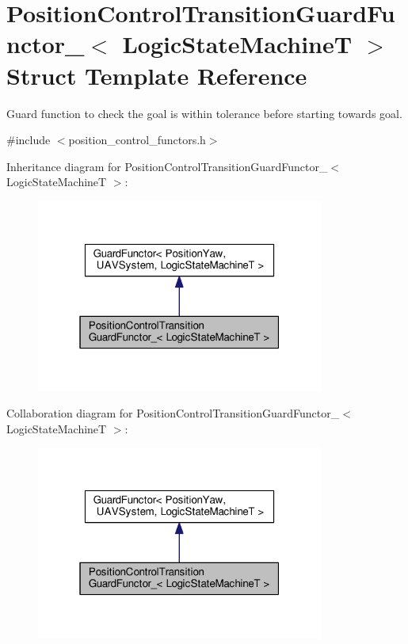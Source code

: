 \hypertarget{structPositionControlTransitionGuardFunctor__}{\section{Position\-Control\-Transition\-Guard\-Functor\-\_\-$<$ Logic\-State\-Machine\-T $>$ Struct Template Reference}
\label{structPositionControlTransitionGuardFunctor__}
}


Guard function to check the goal is within tolerance before starting towards goal.  




{\ttfamily \#include $<$position\-\_\-control\-\_\-functors.\-h$>$}



Inheritance diagram for Position\-Control\-Transition\-Guard\-Functor\-\_\-$<$ Logic\-State\-Machine\-T $>$\-:\nopagebreak
\begin{figure}[H]
\begin{center}
\leavevmode
\includegraphics[width=268pt]{structPositionControlTransitionGuardFunctor____inherit__graph}
\end{center}
\end{figure}


Collaboration diagram for Position\-Control\-Transition\-Guard\-Functor\-\_\-$<$ Logic\-State\-Machine\-T $>$\-:\nopagebreak
\begin{figure}[H]
\begin{center}
\leavevmode
\includegraphics[width=268pt]{structPositionControlTransitionGuardFunctor____coll__graph}
\end{center}
\end{figure}
